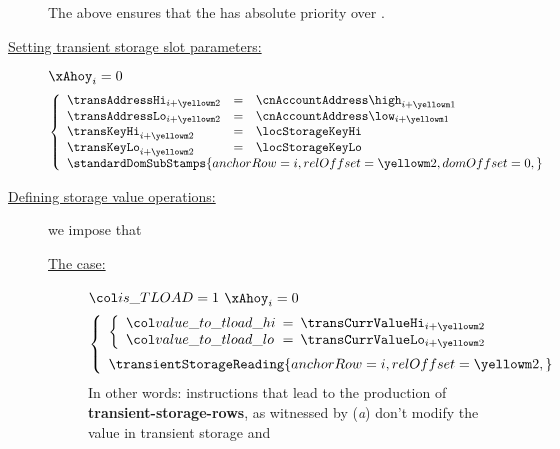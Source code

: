 \begin{description}
		\saNote{}
		The above ensures that the \staticxSH{} has absolute priority over \oogxSH{}.
	\item[\underline{Setting transient storage slot parameters:}]
		\If $\xAhoy_{i} = 0$ \Then
		\[
			\left\{ \begin{array}{lclr}
				\transAddressHi         _{i + \locTransientDoingRow} & = & \cnAccountAddress\high  _{i + \locTransientCurrContextRow } \\
				\transAddressLo         _{i + \locTransientDoingRow} & = & \cnAccountAddress\low   _{i + \locTransientCurrContextRow } \\
				\transKeyHi             _{i + \locTransientDoingRow} & = & \locStorageKeyHi                                            \\
				\transKeyLo             _{i + \locTransientDoingRow} & = & \locStorageKeyLo                                            \\
				\multicolumn{3}{l}{
					\standardDomSubStamps {
						anchorRow = i                     ,
						relOffset = \locTransientDoingRow ,
						domOffset = 0                     ,
					}}
					\\
			\end{array} \right.
		\]
	\item[\underline{Defining storage value operations:}]
		we impose that
		\begin{description}
			\item[\underline{The  case:}]
				\If $\locIsTload = 1$ \et $\xAhoy_{i} = 0$ \Then
				\[
					\left\{ \begin{array}{lcl}
						\left\{ \begin{array}{lcl}
							\locTransientValueToLoadHi & \!\!\! = \!\!\! & \transCurrValueHi_{i + \locTransientDoingRow} \\
							\locTransientValueToLoadLo & \!\!\! = \!\!\! & \transCurrValueLo_{i + \locTransientDoingRow} \\
						\end{array} \right.
						\vspace{2mm} \\
						\transientStorageReading {
							anchorRow = i                     ,
							relOffset = \locTransientDoingRow ,
						}
						\\
					\end{array} \right.
				\]
				\saNote{}
				In other words:  instructions that lead to the production of \textbf{transient-storage-rows}, as witnessed by
				(\emph{a}) don't modify the value in transient storage and

\end{description}
\end{description}
